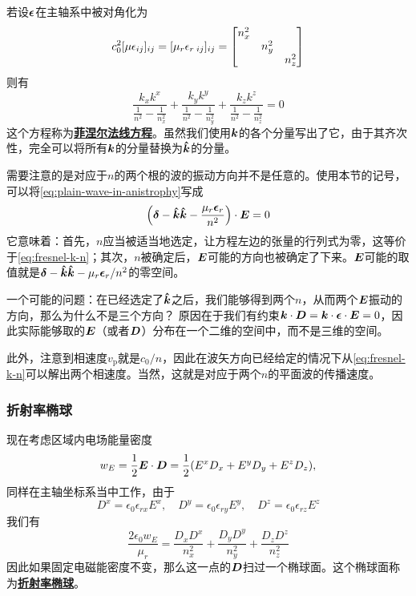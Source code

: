 \documentclass[UTF8, a4paper]{ctexart}
\newcommand*{\concept}[1]{\underline{\textbf{#1}}}
\begin{document}
若设$\vb*{\epsilon}$在主轴系中被对角化为
\begin{equation}
    c_0^2 [\mu \epsilon_{ij}]_{ij} = [\mu_r \epsilon_{r\;ij}]_{ij} = \bmqty{\dmat{n_x^2, n_y^2, n_z^2}}
    \label{eq:diag-two-axis}
\end{equation}
则有
\begin{equation}
    \frac{k_x k^x}{\frac{1}{n^2} - \frac{1}{n_x^2}} + \frac{k_y k^y}{\frac{1}{n^2} - \frac{1}{n_y^2}} + \frac{k_z k^z}{\frac{1}{n^2} - \frac{1}{n_z^2}} = 0
\end{equation}
这个方程称为\concept{菲涅尔法线方程}。虽然我们使用$\vb*{k}$的各个分量写出了它，由于其齐次性，完全可以将所有$\vb*{k}$的分量替换为$\vu*{k}$的分量。

需要注意的是对应于$n$的两个根的波的振动方向并不是任意的。使用本节的记号，可以将\eqref{eq:plain-wave-in-anistrophy}写成
\begin{equation}
    \left(\vb*{\delta} - \vu*{k}\vu*{k} - \frac{\mu_r \vb*{\epsilon}_r}{n^2} \right) \cdot \vb*{E} = 0
\end{equation}
它意味着：首先，$n$应当被适当地选定，让方程左边的张量的行列式为零，这等价于\eqref{eq:fresnel-k-n}；其次，$n$被确定后，$\vb*{E}$可能的方向也被确定了下来。$\vb*{E}$可能的取值就是$\vb*{\delta} - \vu*{k}\vu*{k} - \mu_r \vb*{\epsilon}_r / n^2$的零空间。

一个可能的问题：在已经选定了$\vu*{k}$之后，我们能够得到两个$n$，从而两个$\vb*{E}$振动的方向，那么为什么不是三个方向？
原因在于我们有约束$\vb*{k} \cdot \vb*{D} = \vb*{k} \cdot \vb*{\epsilon} \cdot \vb*{E} = 0$，因此实际能够取的$\vb*{E}$（或者$\vb*{D}$）分布在一个二维的空间中，而不是三维的空间。

此外，注意到相速度$v_\text{p}$就是$c_0 / n$，因此在波矢方向已经给定的情况下从\eqref{eq:fresnel-k-n}可以解出两个相速度。当然，这就是对应于两个$n$的平面波的传播速度。

\subsubsection{折射率椭球}

现在考虑区域内电场能量密度
\[
    w_E = \frac{1}{2} \vb*{E} \cdot \vb*{D} = \frac{1}{2} (E^x D_x + E^y D_y + E^z D_z),
\]
同样在主轴坐标系当中工作，由于
\[
    D^x = \epsilon_0 \epsilon_{rx} E^x, \quad D^y = \epsilon_0 \epsilon_{ry} E^y, \quad D^z = \epsilon_0 \epsilon_{rz} E^z
\]
我们有
\begin{equation}
    \frac{2 \epsilon_0 w_E}{\mu_r} = \frac{D_x D^x}{n_x^2} + \frac{D_y D^y}{n_y^2} + \frac{D_z D^z}{n_z^2}
\end{equation}
因此如果固定电磁能密度不变，那么这一点的$\vb*{D}$扫过一个椭球面。这个椭球面称为\concept{折射率椭球}。
\end{document}
